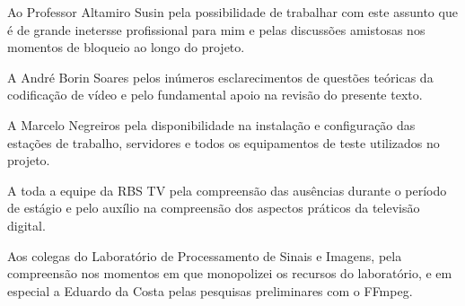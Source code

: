 \documentclass[
	12pt,				%
	openright,			%
	twoside,			%
	a4paper,			%
	brazil,
	french,				%
	english
	]{abntex2}
\begin{document}

\begin{agradecimentos}

Ao Professor Altamiro Susin pela possibilidade de trabalhar com este assunto que é de grande inetersse profissional para mim e pelas discussões amistosas nos momentos de bloqueio ao longo do projeto.

A André Borin Soares pelos inúmeros esclarecimentos de questões teóricas da codificação de vídeo e pelo fundamental apoio na revisão do presente texto.

A Marcelo Negreiros pela disponibilidade na instalação e configuração das estações de trabalho, servidores e todos os equipamentos de teste utilizados no projeto.

A toda a equipe da RBS TV pela compreensão das ausências durante o período de estágio e pelo auxílio na compreensão dos aspectos práticos da televisão digital.

Aos colegas do Laboratório de Processamento de Sinais e Imagens, pela compreensão nos momentos em que monopolizei os recursos do laboratório, e em especial a Eduardo da Costa pelas pesquisas preliminares com o FFmpeg.

\end{agradecimentos}


\end{document}
